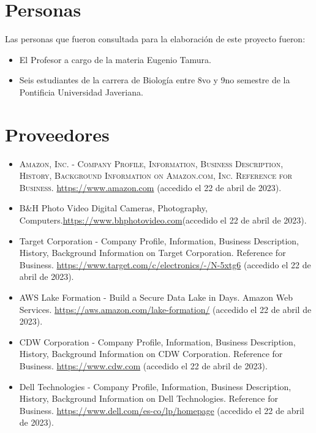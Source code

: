 
\section{Personas}

Las personas que fueron consultada para la elaboración de este proyecto fueron:

\begin{itemize}
    \item El Profesor a cargo de la materia Eugenio Tamura.
    \item Seis estudiantes de la carrera de Biología entre 8vo y 9no semestre de la Pontificia Universidad Javeriana.
\end{itemize}

\section{Proveedores}
\begin{itemize}
    \item \textsc{Amazon, Inc. - Company Profile, Information, Business Description, History, Background Information on Amazon.com, Inc. Reference for Business.} \url{https://www.amazon.com} (accedido el 22 de abril de 2023).
    
    \item B\&H Photo Video Digital Cameras, Photography, Computers.\url{https://www.bhphotovideo.com}(accedido el 22 de abril de 2023).

    \item Target Corporation - Company Profile, Information, Business Description, History, Background Information on Target Corporation. Reference for Business. \url{https://www.target.com/c/electronics/-/N-5xtg6} (accedido el 22 de abril de 2023).

    \item AWS Lake Formation - Build a Secure Data Lake in Days. Amazon Web Services. \url{https://aws.amazon.com/lake-formation/} (accedido el 22 de abril de 2023).

    \item CDW Corporation - Company Profile, Information, Business Description, History, Background Information on CDW Corporation. Reference for Business. \url{https://www.cdw.com} (accedido el 22 de abril de 2023).

    \item Dell Technologies - Company Profile, Information, Business Description, History, Background Information on Dell Technologies. Reference for Business. \url{https://www.dell.com/es-co/lp/homepage} (accedido el 22 de abril de 2023).
\end{itemize}
    
\begin{comment}
    
    
\end{comment}
